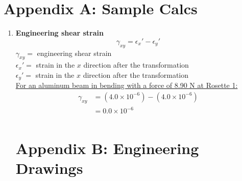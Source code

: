 \section*{Appendix A: Sample Calcs}

\begin{enumerate}[wide,label=\textbf{\arabic*}., labelindent=0pt]

    \item \textbf{Engineering shear strain}
        \[\gamma_{xy} = \epsilon_x' - \epsilon_y'\]
        $\gamma_{xy} =$ engineering shear strain\\
        $\epsilon_x' =$ strain in the $x$ direction after the transformation\\
        $\epsilon_y' =$ strain in the $x$ direction after the transformation\\
        
        \underline{For an aluminum beam in bending with a force of 8.90 N at Rosette 1:} \\
        \begin{align*}
            \gamma_{xy} &= (4.0 \times 10^{-6}) - (4.0 \times 10^{-6})\\
            &= 0.0 \times 10^{-6}\\
        \end{align*}
 
\section*{Appendix B: Engineering Drawings}   

\end{enumerate}